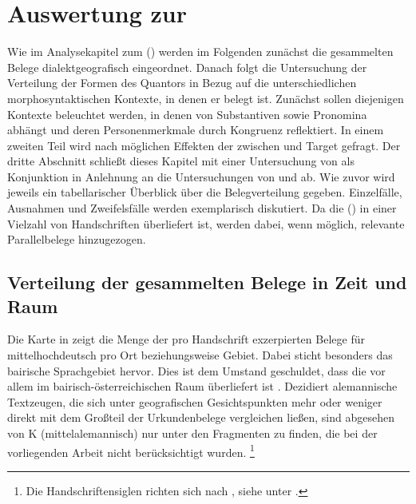 \chapter{Auswertung zur }
\label{ch:kcanalyse}

Wie im Analysekapitel zum  (\CAO)
werden im Folgenden zunächst die gesammelten Belege
dialektgeografisch eingeordnet. Danach folgt die
Untersuchung der Verteilung der Formen des
Quantors  in Bezug auf die unterschiedlichen morphosyntaktischen
Kontexte, in denen er belegt ist. Zunächst sollen diejenigen Kontexte
beleuchtet werden, in denen  von Substantiven sowie Pronomina
abhängt und deren Personenmerkmale durch Kongruenz
reflektiert. In einem zweiten Teil wird nach möglichen Effekten der
 zwischen  und Target gefragt. Der dritte
Abschnitt schließt dieses Kapitel mit einer Untersuchung von  als
Konjunktion in Anlehnung an die Untersuchungen von \citet{askedal1974} und
\citet{gjelsten1980} ab. Wie zuvor wird jeweils ein tabellarischer Überblick
über die Belegverteilung gegeben. Einzelfälle,
Ausnahmen und Zweifelsfälle werden exemplarisch
diskutiert. Da die  (\KC{}) in einer Vielzahl von
Handschriften überliefert ist, werden dabei, wenn möglich, relevante
Parallelbelege hinzugezogen.

\section{Verteilung der gesammelten Belege in Zeit und Raum}
\label{subsec:beiddispmap}


Die Karte in  zeigt die Menge der pro Handschrift
exzerpierten Belege für mittelhochdeutsch 
pro Ort beziehungsweise Gebiet. Dabei sticht besonders das
bairische Sprachgebiet hervor. Dies ist dem Umstand
geschuldet, dass die \KC{} vor allem im
bairisch-österreichischen Raum überliefert ist
\autocite{klein1988}. Dezidiert alemannische
Textzeugen, die sich unter geografischen Gesichtspunkten mehr oder weniger
direkt mit dem Großteil der Urkundenbelege vergleichen ließen, sind abgesehen
von K (mittelalemannisch) nur unter den Fragmenten
zu finden, die bei der vorliegenden Arbeit nicht berücksichtigt wurden.%
%
	\footnote{Die Handschriftensiglen richten sich nach ,
		siehe unter .%
	}

